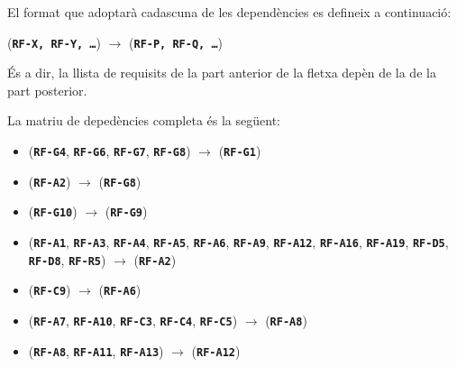 \documentclass[a4paper,12pt]{ThesisStyle}
\begin{document}
El format que adoptarà cadascuna de les dependències es defineix a continuació:
\\[8pt]
\centerline{(\texttt{\textbf{RF-X, RF-Y, \ldots}}) \hspace{1pt} $\longrightarrow$ \hspace{1pt} (\texttt{\textbf{RF-P, RF-Q, \ldots}})}

És a dir, la llista de requisits de la part anterior de la fletxa depèn de la de la part posterior.

La matriu de depedències completa és la següent:

\begin{itemize}
  \item (\texttt{\textbf{RF-G4}}, \texttt{\textbf{RF-G6}}, \texttt{\textbf{RF-G7}}, \texttt{\textbf{RF-G8}}) \hspace{1pt} $\longrightarrow$ \hspace{1pt} (\texttt{\textbf{RF-G1}})
  \item (\texttt{\textbf{RF-A2}}) \hspace{1pt} $\longrightarrow$ \hspace{1pt} (\texttt{\textbf{RF-G8}})
  \item (\texttt{\textbf{RF-G10}}) \hspace{1pt} $\longrightarrow$ \hspace{1pt} (\texttt{\textbf{RF-G9}})
  \item (\texttt{\textbf{RF-A1}}, \texttt{\textbf{RF-A3}}, \texttt{\textbf{RF-A4}}, \texttt{\textbf{RF-A5}}, \texttt{\textbf{RF-A6}}, \texttt{\textbf{RF-A9}}, \texttt{\textbf{RF-A12}}, \texttt{\textbf{RF-A16}}, \texttt{\textbf{RF-A19}}, \texttt{\textbf{RF-D5}}, \texttt{\textbf{RF-D8}}, \texttt{\textbf{RF-R5}}) \hspace{1pt} $\longrightarrow$ \hspace{1pt} (\texttt{\textbf{RF-A2}})
  \item (\texttt{\textbf{RF-C9}}) \hspace{1pt} $\longrightarrow$ \hspace{1pt} (\texttt{\textbf{RF-A6}})
  \item (\texttt{\textbf{RF-A7}}, \texttt{\textbf{RF-A10}}, \texttt{\textbf{RF-C3}}, \texttt{\textbf{RF-C4}}, \texttt{\textbf{RF-C5}}) \hspace{1pt} $\longrightarrow$ \hspace{1pt} (\texttt{\textbf{RF-A8}})
  \item (\texttt{\textbf{RF-A8}}, \texttt{\textbf{RF-A11}}, \texttt{\textbf{RF-A13}}) \hspace{1pt} $\longrightarrow$ \hspace{1pt} (\texttt{\textbf{RF-A12}})

\end{itemize}
\end{document}
